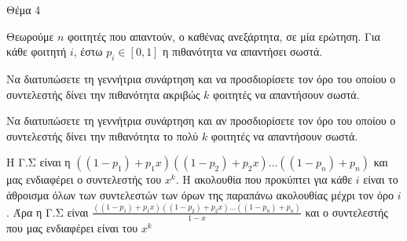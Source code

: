 \documentclass{assignment}
\begin{document}
\begin{problem}{Θέμα 4}

Θεωρούμε $n$ φοιτητές που απαντούν, ο καθένας ανεξάρτητα, σε μία ερώτηση. Για κάθε φοιτητή $i$, έστω $p_i \in [0,1]$ η πιθανότητα
να απαντήσει σωστά.

 Να διατυπώσετε τη γεννήτρια συνάρτηση και να προσδιορίσετε τον όρο του οποίου ο συντελεστής δίνει την πιθανότητα 
ακριβώς $k$ φοιτητές να απαντήσουν σωστά.

 Να διατυπώσετε τη γεννήτρια συνάρτηση και αν προσδιορίσετε τον όρο του οποίου ο συντελεστής δίνει την πιθανότητα
το πολύ $k$ φοιτητές να απαντήσουν σωστά.

\solution

\answer Η Γ.Σ είναι η $((1-p_1) + p_1x)((1-p_2) + p_2x)\dots((1-p_n) + p_n)$ και μας ενδιαφέρει ο συντελεστής του $x^k$.
\answer Η ακολουθία που προκύπτει για κάθε $i$ είναι το άθροισμα όλων των συντελεστών των όρων της παραπάνω ακολουθίας μέχρι
τον όρο $i$. Άρα η Γ.Σ είναι $\frac{((1-p_1) + p_1x)((1-p_2) + p_2x)\dots((1-p_n) + p_n)}{1-x}$ και ο συντελεστής που μας 
ενδιαφέρει είναι του $x^k$
\end{problem}
\end{document}
